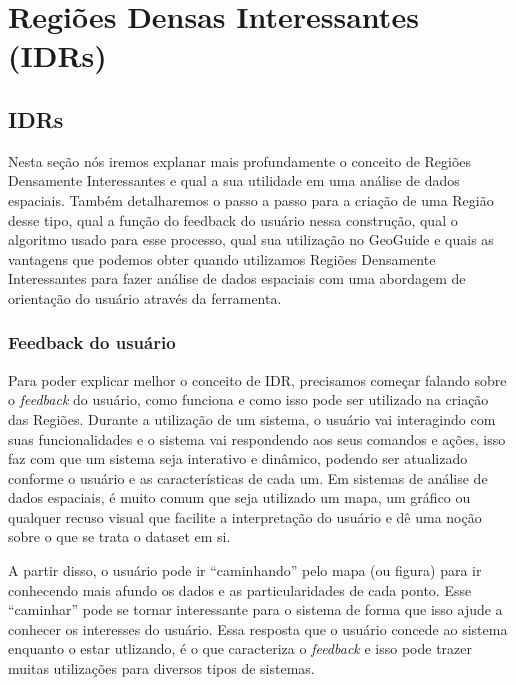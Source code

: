 \chapter{Regiões Densas Interessantes (IDRs)}


\section{IDRs}

Nesta seção nós iremos explanar mais profundamente o conceito de Regiões Densamente Interessantes e qual a sua utilidade em uma análise de dados espaciais. Também detalharemos o passo a passo para a criação de uma Região desse tipo, qual a função do feedback do usuário nessa construção, qual o algoritmo usado para esse processo, qual sua utilização no GeoGuide e quais as vantagens que podemos obter quando utilizamos Regiões Densamente Interessantes para fazer análise de dados espaciais com uma abordagem de orientação do usuário através da ferramenta.

\subsection{Feedback do usuário}

Para poder explicar melhor o conceito de IDR, precisamos começar falando sobre o \textit{feedback} do usuário, como funciona e como isso pode ser utilizado na criação das Regiões. Durante a utilização de um sistema, o usuário vai interagindo com suas funcionalidades e o sistema vai respondendo aos seus comandos e ações, isso faz com que um sistema seja interativo e dinâmico, podendo ser atualizado conforme o usuário e as características de cada um. Em sistemas de análise de dados espaciais, é muito comum que seja utilizado um mapa, um gráfico ou qualquer recuso visual que facilite a interpretação do usuário e dê uma noção sobre o que se trata o dataset em si.

A partir disso, o usuário pode ir ``caminhando'' pelo mapa (ou figura) para ir conhecendo mais afundo os dados e as particularidades de cada ponto. Esse ``caminhar'' pode se tornar interessante para o sistema de forma que isso ajude a conhecer os interesses do usuário. Essa resposta que o usuário concede ao sistema enquanto o estar utlizando, é o que caracteriza o \textit{feedback} e isso pode trazer muitas utilizações para diversos tipos de sistemas.

